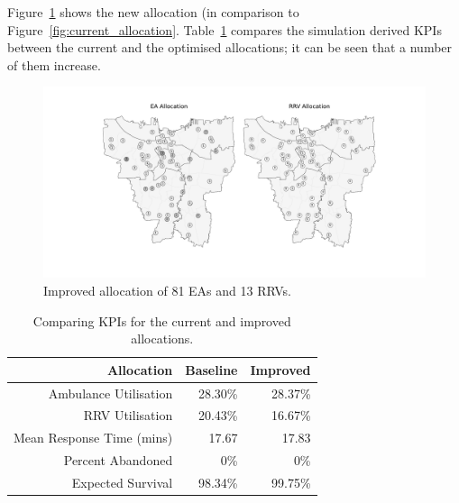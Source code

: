 \documentclass[preprint,12pt]{elsarticle}
\begin{document}
Figure~\ref{fig:optimal_current_allocation} shows the new allocation (in
comparison to Figure~\ref{fig:current_allocation}.
Table~\ref{tbl:current_optimal_compare} compares the simulation derived KPIs
between the current and the optimised allocations; it can be seen that a
number of them increase.

\begin{figure}
\begin{center}
\includegraphics[width=\textwidth]{img/map_current}
\caption{Improved allocation of 81 EAs and 13 RRVs.}
\label{fig:optimal_current_allocation}
\end{center}
\end{figure}

\begin{table}
\begin{center}
\begin{tabular}{rrr}
\toprule
Allocation & Baseline & Improved \\
\midrule
Ambulance Utilisation & 28.30\% & 28.37\% \\
RRV Utilisation & 20.43\% & 16.67\% \\
Mean Response Time (mins) & 17.67 & 17.83 \\
Percent Abandoned & 0\% & 0\% \\
Expected Survival & 98.34\% & 99.75\% \\
\bottomrule
\end{tabular}
\caption{Comparing KPIs for the current and improved allocations.}
\label{tbl:current_optimal_compare}
\end{center}
\end{table}
\end{document}
